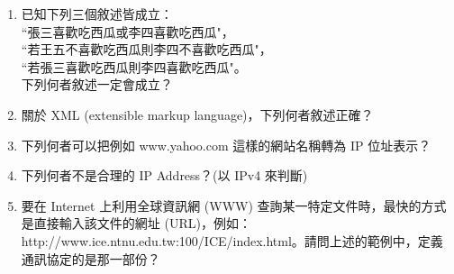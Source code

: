 \documentclass[12pt,a4paper]{report}
\begin{document}
\begin{CJK}{UTF8}{bkai}
\begin{enumerate}
\item 已知下列三個敘述皆成立：\\
``張三喜歡吃西瓜或李四喜歡吃西瓜"，\\
``若王五不喜歡吃西瓜則李四不喜歡吃西瓜"，\\
``若張三喜歡吃西瓜則李四喜歡吃西瓜"。\\
下列何者敘述一定會成立？
\item 關於 XML (extensible markup language)，下列何者敘述正確？
\item 下列何者可以把例如 www.yahoo.com 這樣的網站名稱轉為 IP 位址表示？
\item 下列何者不是合理的 IP Address？(以 IPv4 來判斷)
\item 要在 Internet 上利用全球資訊網 (WWW) 查詢某一特定文件時，最快的方式是直接輸入該文件的網址 (URL)，例如：http://www.ice.ntnu.edu.tw:100/ICE/index.html。請問上述的範例中，定義通訊協定的是那一部份？

\end{enumerate}
\end{CJK}
\end{document}

